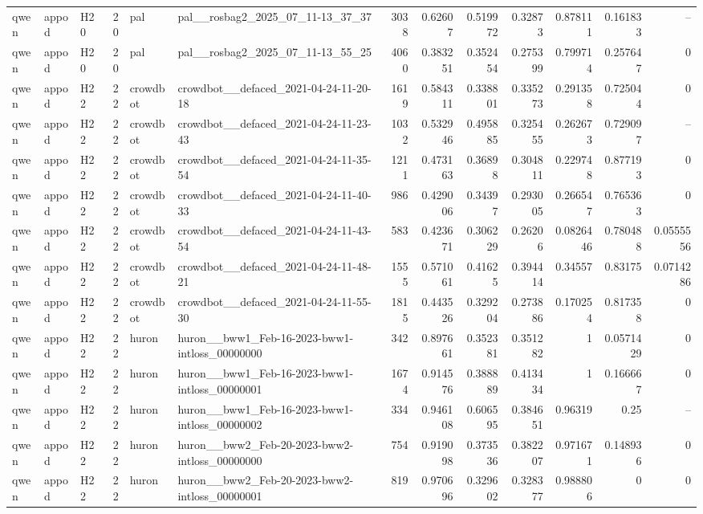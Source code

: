 \begin{longtable}{lllrllrrrrrrr}
qwen & appod & H20 & 20 & pal & pal\_\_rosbag2\_2025\_07\_11-13\_37\_37 & 3038 & 0.62607 & 0.519972 & 0.32873 & 0.878111 & 0.161833 & -- \\
qwen & appod & H20 & 20 & pal & pal\_\_rosbag2\_2025\_07\_11-13\_55\_25 & 4060 & 0.383251 & 0.352454 & 0.275399 & 0.799714 & 0.257647 & 0 \\
qwen & appod & H22 & 22 & crowdbot & crowdbot\_\_defaced\_2021-04-24-11-20-18 & 1619 & 0.584311 & 0.338801 & 0.335273 & 0.291358 & 0.725044 & 0 \\
qwen & appod & H22 & 22 & crowdbot & crowdbot\_\_defaced\_2021-04-24-11-23-43 & 1032 & 0.532946 & 0.495885 & 0.325455 & 0.262673 & 0.729097 & -- \\
qwen & appod & H22 & 22 & crowdbot & crowdbot\_\_defaced\_2021-04-24-11-35-54 & 1211 & 0.473163 & 0.36898 & 0.304811 & 0.229748 & 0.877193 & 0 \\
qwen & appod & H22 & 22 & crowdbot & crowdbot\_\_defaced\_2021-04-24-11-40-33 & 986 & 0.429006 & 0.34397 & 0.293005 & 0.266547 & 0.765363 & 0 \\
qwen & appod & H22 & 22 & crowdbot & crowdbot\_\_defaced\_2021-04-24-11-43-54 & 583 & 0.423671 & 0.306229 & 0.26206 & 0.0826446 & 0.780488 & 0.0555556 \\
qwen & appod & H22 & 22 & crowdbot & crowdbot\_\_defaced\_2021-04-24-11-48-21 & 1555 & 0.571061 & 0.41625 & 0.394414 & 0.34557 & 0.83175 & 0.0714286 \\
qwen & appod & H22 & 22 & crowdbot & crowdbot\_\_defaced\_2021-04-24-11-55-30 & 1815 & 0.443526 & 0.329204 & 0.273886 & 0.170254 & 0.817358 & 0 \\
qwen & appod & H22 & 22 & huron & huron\_\_bww1\_Feb-16-2023-bww1-intloss\_00000000 & 342 & 0.897661 & 0.352381 & 0.351282 & 1 & 0.0571429 & 0 \\
qwen & appod & H22 & 22 & huron & huron\_\_bww1\_Feb-16-2023-bww1-intloss\_00000001 & 1674 & 0.914576 & 0.388889 & 0.413434 & 1 & 0.166667 & 0 \\
qwen & appod & H22 & 22 & huron & huron\_\_bww1\_Feb-16-2023-bww1-intloss\_00000002 & 334 & 0.946108 & 0.606595 & 0.384651 & 0.96319 & 0.25 & -- \\
qwen & appod & H22 & 22 & huron & huron\_\_bww2\_Feb-20-2023-bww2-intloss\_00000000 & 754 & 0.919098 & 0.373536 & 0.382207 & 0.971671 & 0.148936 & 0 \\
qwen & appod & H22 & 22 & huron & huron\_\_bww2\_Feb-20-2023-bww2-intloss\_00000001 & 819 & 0.970696 & 0.329602 & 0.328377 & 0.988806 & 0 & 0 \\

\end{longtable}
